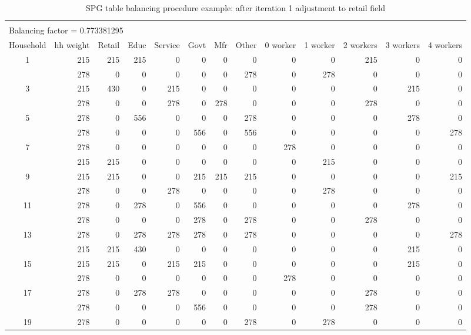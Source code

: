 \begin{sidewaystable}  %
\centering
\caption{SPG table balancing procedure example: after iteration 1 adjustment to retail field}
\label{tab:spg-after-retail-iteration1}
\small
\begin{tabular}{c*{12}{r}}
\vspace{-8pt} \\
\multicolumn{8}{l}{Balancing factor = 0.773381295} \\
\hline
Household & hh weight & Retail & Educ & Service & Govt & Mfr & Other & 0 worker & 1 worker & 2 workers & 3 workers & 4 workers \\
\hline
1 & 215 & 215 & 215 & 0 & 0 & 0 & 0 & 0 & 0 & 215 & 0 & 0 \\
\gray 2 & 278 & 0 & 0 & 0 & 0 & 0 & 278 & 0 & 278 & 0 & 0 & 0 \\
3 & 215 & 430 & 0 & 215 & 0 & 0 & 0 & 0 & 0 & 0 & 215 & 0 \\
\gray 4 & 278 & 0 & 0 & 278 & 0 & 278 & 0 & 0 & 0 & 278 & 0 & 0 \\
5 & 278 & 0 & 556 & 0 & 0 & 0 & 278 & 0 & 0 & 0 & 278 & 0 \\
\gray 6 & 278 & 0 & 0 & 0 & 556 & 0 & 556 & 0 & 0 & 0 & 0 & 278 \\
7 & 278 & 0 & 0 & 0 & 0 & 0 & 0 & 278 & 0 & 0 & 0 & 0 \\
\gray 8 & 215 & 215 & 0 & 0 & 0 & 0 & 0 & 0 & 215 & 0 & 0 & 0 \\
9 & 215 & 215 & 0 & 0 & 215 & 215 & 215 & 0 & 0 & 0 & 0 & 215 \\
\gray 10 & 278 & 0 & 0 & 278 & 0 & 0 & 0 & 0 & 278 & 0 & 0 & 0 \\
11 & 278 & 0 & 278 & 0 & 556 & 0 & 0 & 0 & 0 & 0 & 278 & 0 \\
\gray 12 & 278 & 0 & 0 & 0 & 278 & 0 & 278 & 0 & 0 & 278 & 0 & 0 \\
13 & 278 & 0 & 278 & 278 & 278 & 0 & 278 & 0 & 0 & 0 & 0 & 278 \\
\gray 14 & 215 & 215 & 430 & 0 & 0 & 0 & 0 & 0 & 0 & 0 & 215 & 0 \\
15 & 215 & 215 & 0 & 215 & 215 & 0 & 0 & 0 & 0 & 0 & 215 & 0 \\
\gray 16 & 278 & 0 & 0 & 0 & 0 & 0 & 0 & 278 & 0 & 0 & 0 & 0 \\
17 & 278 & 0 & 278 & 278 & 0 & 0 & 0 & 0 & 0 & 278 & 0 & 0 \\
\gray 18 & 278 & 0 & 0 & 0 & 556 & 0 & 0 & 0 & 0 & 278 & 0 & 0 \\
19 & 278 & 0 & 0 & 0 & 0 & 0 & 278 & 0 & 278 & 0 & 0 & 0 \\

\end{tabular}
\end{sidewaystable}
